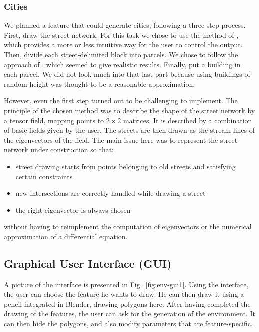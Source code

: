 \subsubsection{Cities}

We planned a feature that could generate cities, following a
three-step process. First, draw the street network. For this task we
chose to use the method of \cite{StreetTensors}, which provides a more
or less intuitive way for the user to control the output. Then, divide
each street-delimited block into parcels. We chose to follow the
approach of \cite{PGParcels}, which seemed to give realistic
results. Finally, put a building in each parcel. We did not look much
into that last part because using buildings of random height was
thought to be a reasonable approximation.

However, even the first step turned out to be challenging to
implement. The principle of the chosen method was to describe the
shape of the street network by a tensor field, mapping points to $2
\times 2$ matrices. It is described by a combination of basic fields
given by the user. The streets are then drawn as the stream lines of
the eigenvectors of the field. The main issue here was to represent
the street network under construction so that:
\begin{itemize}
  \item street drawing starts from points belonging to old streets and
satisfying certain constraints
  \item new intersections are correctly handled while drawing a street
  \item the right eigenvector is always chosen
\end{itemize} without having to reimplement the computation of
eigenvectors or the numerical approximation of a differential
equation.


\subsection{Graphical User Interface (GUI)}

A picture of the interface is presented in
Fig.~\ref{fig:env-gui1}. Using the interface, the user can choose the
feature he wants to draw. He can then draw it using a pencil
integrated in Blender, drawing polygons here. After having completed
the drawing of the features, the user can ask for the generation of
the environment. It can then hide the polygons, and also modify
parameters that are feature-specific.

